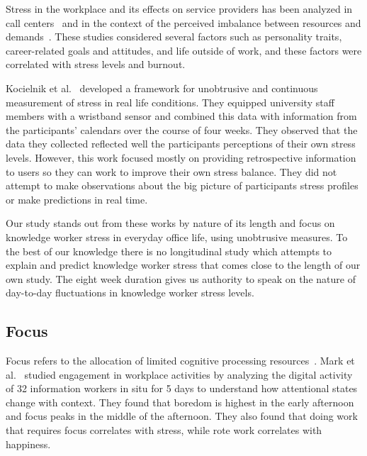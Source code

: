 Stress in the workplace and its effects on service providers has been analyzed in call centers~\cite{Hernandez11} and in the context of the perceived imbalance between resources and demands~\cite{cherniss80}. These studies considered several factors such as personality traits, career-related goals and attitudes, and life outside of work, and these factors were correlated with stress levels and burnout.

Kocielnik et al.~\cite{kocielnik_smart_2013} developed a framework for unobtrusive and continuous measurement of stress in real life conditions. They equipped university staff members with a wristband sensor and combined this data with information from the participants' calendars over the course of four weeks. They observed that the data they collected reflected well the participants perceptions of their own stress levels. However, this work focused mostly on providing retrospective information to users so they can work to improve their own stress balance. They did not attempt to make observations about the big picture of participants stress profiles or make predictions in real time.


Our study stands out from these works by nature of its length and focus on knowledge worker stress in everyday office life, using unobtrusive measures. To the best of our knowledge there is no longitudinal study which attempts to explain and predict knowledge worker stress that comes close to the length of our own study. The eight week duration gives us authority to speak on the nature of day-to-day fluctuations in knowledge worker stress levels.




\subsection{Focus}
Focus refers to the allocation of limited cognitive processing resources~\cite{Anderson04}.
Mark et al.~\cite{mark2014bored} studied engagement in workplace activities by analyzing the digital activity of 32 information workers in situ for 5 days to understand how attentional states change with context. They found that boredom is highest in the early afternoon and focus peaks in the middle of the afternoon. They also found that doing work that requires focus correlates with stress, while rote work correlates with happiness.

